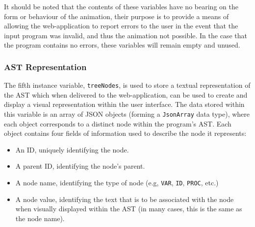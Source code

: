 \documentclass{l4proj}
\begin{document}
It should be noted that the contents of these variables have no bearing on the form or behaviour of the animation, their purpose is to provide a means of allowing the web-application to report errors to the user in the event that the input program was invalid, and thus the animation not possible. In the case that the program contains no errors, these variables will remain empty and unused.

\subsubsection{AST Representation}
The fifth instance variable, \texttt{treeNodes}, is used to store a textual representation of the AST which when delivered to the web-application, can be used to create and display a visual representation within the user interface. The data stored within this variable is an array of JSON objects (forming a \texttt{JsonArray} data type), where each object corresponds to a distinct node within the program's AST. Each object contains four fields of information used to describe the node it represents:
\begin{itemize}
\item An ID, uniquely identifying the node.
\item A parent ID, identifying the node's parent.
\item A node name, identifying the type of node (e.g, \texttt{VAR}, \texttt{ID}, \texttt{PROC}, etc.)
\item A node value, identifying the text that is to be associated with the node when visually displayed within the AST (in many cases, this is the same as the node name).
\end{itemize}
\end{document}
